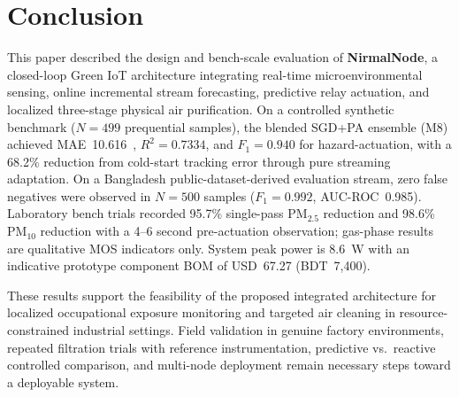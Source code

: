 
\section{Conclusion}
\label{sec:conclusion}

This paper described the design and bench-scale evaluation of \textbf{NirmalNode}, a
closed-loop Green IoT architecture integrating real-time microenvironmental sensing,
online incremental stream forecasting, predictive relay actuation, and localized
three-stage physical air purification. On a controlled synthetic benchmark ($N=499$
prequential samples), the blended SGD+PA ensemble (M8) achieved MAE~10.616~\ugsm,
$R^2=0.7334$, and $F_1=0.940$ for hazard-actuation, with a 68.2\% reduction from
cold-start tracking error through pure streaming adaptation. On a Bangladesh
public-dataset-derived evaluation stream, zero false negatives were observed in
$N=500$ samples ($F_1=0.992$, AUC-ROC~0.985). Laboratory bench trials recorded 95.7\%
single-pass PM$_{2.5}$ reduction and 98.6\% PM$_{10}$ reduction with a 4--6 second
pre-actuation observation; gas-phase results are qualitative MOS indicators only.
System peak power is 8.6~W with an indicative prototype component BOM of
USD~67.27 (BDT~7,400).

These results support the feasibility of the proposed integrated architecture for
localized occupational exposure monitoring and targeted air cleaning in
resource-constrained industrial settings. Field validation in genuine factory
environments, repeated filtration trials with reference instrumentation, predictive
vs.\ reactive controlled comparison, and multi-node deployment remain necessary
steps toward a deployable system.
